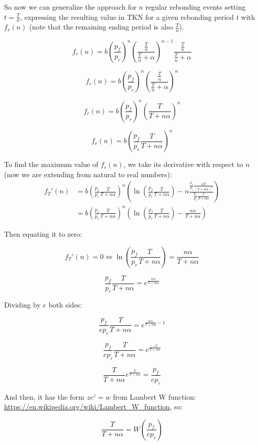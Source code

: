 \documentclass{article}
\begin{document}
So now we can generalize the approach for $n$ regular rebonding events setting $t=\frac{T}{n}$, expressing the resulting value in TKN for a given rebonding period $t$ with $f_r(n)$ (note that the remaining ending period is also $\frac{T}{n}$).

\[
f_r(n) = b \left(\frac{p_f}{p_r}\right)^n \left(\frac{\frac{T}{n}}{\frac{T}{n}+\alpha}\right)^{n-1} \frac{\frac{T}{n}}{\frac{T}{n}+\alpha}
\]

\[
f_r(n) = b \left(\frac{p_f}{p_r}\right)^n \left(\frac{\frac{T}{n}}{\frac{T}{n}+\alpha}\right)^{n}
\]

\[
f_r(n) = b \left(\frac{p_f}{p_r}\right)^n \left(\frac{T}{T + n\alpha}\right)^{n}
\]

\begin{equation}
  \label{eq:n-rebond_1}
f_r(n) = b \left(\frac{p_f}{p_r} \frac{T}{T+n \alpha} \right)^{n}
\end{equation}

To find the maximum value of $f_r(n)$, we take its derivative with respect to $n$ (now we are extending from natural to real numbers):
\[
\begin{split}
  f_T'(n) &= b \left(\frac{p_f}{p_r} \frac{T}{T+n\alpha}\right)^n \left(\ln\left(\frac{p_f}{p_r} \frac{T}{T+n\alpha}\right) - n \frac{\frac{p_f}{p_r} \frac{\alpha T}{(T+n\alpha)^2}}{\frac{p_f}{p_r} \frac{T}{T+n\alpha}}\right) \\
  &= b \left(\frac{p_f}{p_r} \frac{T}{T+n\alpha}\right)^n \left(\ln\left(\frac{p_f}{p_r} \frac{T}{T+n\alpha}\right) - \frac{n\alpha}{T+n\alpha}\right)
\end{split}
\]

Then equating it to zero:

\[
f_T'(n) = 0 \iff \ln\left(\frac{p_f}{p_r} \frac{T}{T+n\alpha}\right) = \frac{n\alpha}{T+n\alpha}
\]

\[
\frac{p_f}{p_r} \frac{T}{T+n\alpha} = e^{\frac{n\alpha}{T+n\alpha}}
\]

Dividing by $e$ both sides:

\[
\frac{p_f}{e p_r} \frac{T}{T+n\alpha} = e^{\frac{n\alpha}{T+n\alpha} - 1}
\]

\[
\frac{p_f}{e p_r} \frac{T}{T+n\alpha} = e^{\frac{-T}{T+n\alpha}}
\]

\[
\frac{T}{T+n\alpha} e^{\frac{T}{T+n\alpha}} = \frac{p_f}{e p_r} 
\]

And then, it has the form $z e^z = w$ from Lambert W function: \url{https://en.wikipedia.org/wiki/Lambert_W_function}, so:

\[
\frac{T}{T+n\alpha} = W\left(\frac{p_f}{e p_r} \right)
\]
\end{document}
